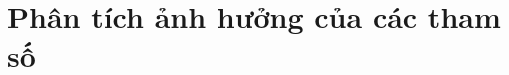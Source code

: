 \documentclass[../DoAn.tex]{subfiles}
\begin{document}
  \section{Phân tích ảnh hưởng của các tham số}
\end{document}
